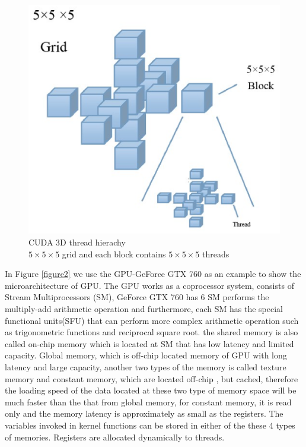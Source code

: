 \documentclass[12pt,a4paper,final]{article}
\begin{document}
\begin{spacing}{2.5}
\begin{figure}[htb]
\includegraphics[scale=0.5]{CUDA_programming_hierachy.eps}
\caption{CUDA 3D thread hierachy\\ $5\times 5\times 5$ grid and each block contains $5\times 5\times 5$ threads\\}
\label{figure1}
\end{figure}
In Figure \ref{figure2} we use the GPU-GeForce GTX 760 as an example to show the microarchitecture of  GPU. The GPU works as a coprocessor system, consists of Stream Multiprocessors (SM), GeForce GTX 760 has 6 SM performs the multiply-add arithmetic operation and furthermore, each SM has the special functional units(SFU) that can perform more complex arithmetic operation such as trigonometric functions and reciprocal square root. the shared memory is also called on-chip memory which is located at SM that has low latency and limited capacity. Global memory, which is off-chip located memory of GPU with long latency and large capacity, another two types of the memory is called texture memory and constant memory, which are located off-chip , but cached, therefore the loading speed of the data located at these two type of memory space will be much faster than the that from global memory, for constant memory, it is read only and the memory latency is approximately as small as the registers.  The variables invoked in kernel functions can be stored in either of the these 4 types of memories. Registers are allocated dynamically to threads.\\

\end{spacing}
\end{document}
